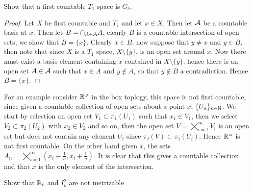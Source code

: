 


    \maketitle 

    \question 
    Show that a first countable $T_1$ space is $G_\delta$. 

    \begin{proof}
        Let $X$ be first countable and $T_1$ and let $x \in X$. Then let $\cal A$ be a countable basis at $x$. 
        Then let $B = \cap_{A \in \cal A}A$, clearly $B$ is a countable intersection of open sets, we show that $B = \{x\}$. 
        Clearly $x \in B$, now suppose that $y \neq x$ and $y \in B$, then note that since $X$ is a $T_1$ space, $X \setminus \{y\}$, 
        is an open set around $x$. Now there must exist a basis element containing $x$ contained in $X \setminus \{y\}$, hence 
        there is an open set $A \in \cal A$ such that $x \in A$ and $y \notin A$, so that $y \notin B$ a contradiction. Hence $B = \{x\}$.  
    \end{proof}

    For an example consider $\mathbb{R}^\omega$ in the box toplogy, this space is not first countable, since given a countable collection of open sets about a point $x$, $\{U_n\}_{n \in \mathbb{N}}$. 
    We start by selection an open set $V_1 \subset \pi_1(U_1)$ such that $x_1 \in V_1$, then we select $V_2 \subset \pi_2(U_2)$ with $x_2 \in V_2$ and so on, then the open set 
    $V = \bigtimes_{i = 1}^\infty V_i$ is an open set but does not contain any element $U_i$ since $\pi_i(V) \subset \pi_i(U_i)$. Hence $\mathbb{R}^\omega$ is not first countable. 
    On the other hand given $x$, the sets  $ A_n = \bigtimes_{i = 1}^\infty (x_i - \frac{1}{n}, x_i + \frac{1}{n})$. It is clear that this gives a countable collection and that $x$ is the only element of the intersection. 


    \question 
    Show that $\mathbb{R}_{\ell}$ and $I^2_o$ are not metrizable 

